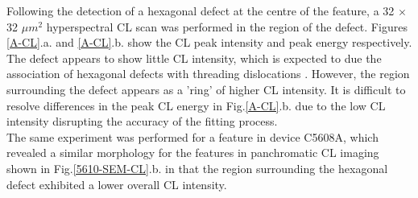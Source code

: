 Following the detection of a hexagonal defect at the centre of the feature, a 32 $\times$ 32 $\mu m^{2}$ hyperspectral CL scan was performed in the region of the defect. Figures \ref{A-CL}.a. and \ref{A-CL}.b. show the CL peak intensity and peak energy respectively. The defect appears to show little CL intensity, which is expected to due the association of hexagonal defects with threading dislocations \cite{Bennett2010b}. However, the region surrounding the defect appears as a 'ring' of higher CL intensity. It is difficult to resolve differences in the peak CL energy in Fig.\ref{A-CL}.b. due to the low CL intensity disrupting the accuracy of the fitting process.\\
The same experiment was performed for a feature in device C5608A, which revealed a similar morphology for the features in panchromatic CL imaging shown in Fig.\ref{5610-SEM-CL}.b. in that the region surrounding the hexagonal defect exhibited a lower overall CL intensity.
